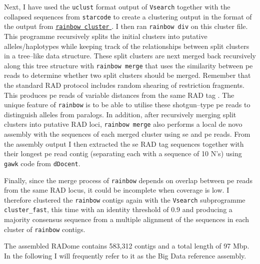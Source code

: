\documentclass[a4paper,12pt,times,print,index,custombib,custommargin]{PhDThesisPSnPDF}\usepackage[]{graphicx}\usepackage[]{color}
\begin{document}
Next, I have used the \texttt{uclust} format output of \texttt{Vsearch} together with the collapsed sequences from \texttt{starcode} to create a clustering output in the format of the output from \href{https://sourceforge.net/projects/bio-rainbow/files/}{\texttt{rainbow cluster} }\citep{Chong2012}. I then ran \texttt{rainbow div} on this cluster file. This programme recursively splits the initial clusters into putative alleles/haplotypes while keeping track of the relationships between split clusters in a tree--like data structure. These split clusters are next merged back recursively along this tree structure with \texttt{rainbow merge} that uses the similarity between \gls{pe} reads to determine whether two split clusters should be merged. Remember that the standard RAD protocol \citep{Baird2008} includes random shearing of restriction fragments. This produces \gls{pe} reads of variable distances from the same RAD tag \citep{Etter2011}. The unique feature of \texttt{rainbow} is to be able to utilise these shotgun--type \gls{pe} reads to distinguish alleles from paralogs. In addition, after recursively merging split clusters into putative RAD loci, \texttt{rainbow merge} also performs a local de novo assembly with the sequences of each merged cluster using \gls{se} and \gls{pe} reads. From the assembly output I then extracted the \gls{se} RAD tag sequences together with their longest \gls{pe} read contig (separating each with a sequence of 10 N's) using \texttt{gawk} code from \texttt{dDocent}. 

Finally, since the merge process of \texttt{rainbow} depends on overlap between \gls{pe} reads from the same RAD locus, it could be incomplete when coverage is low. I therefore clustered the \texttt{rainbow} contigs again with the \texttt{Vsearch} subprogramme \texttt{cluster\_fast}, this time with an identity threshold of 0.9 and producing a majority consensus sequence from a multiple alignment of the sequences in each cluster of \texttt{rainbow} contigs.

The assembled RADome contains 583,312 contigs and a total length of 97 \gls{Mbp}. In the following I will frequently refer to it as the Big Data reference assembly. 
%
%
\end{document}
